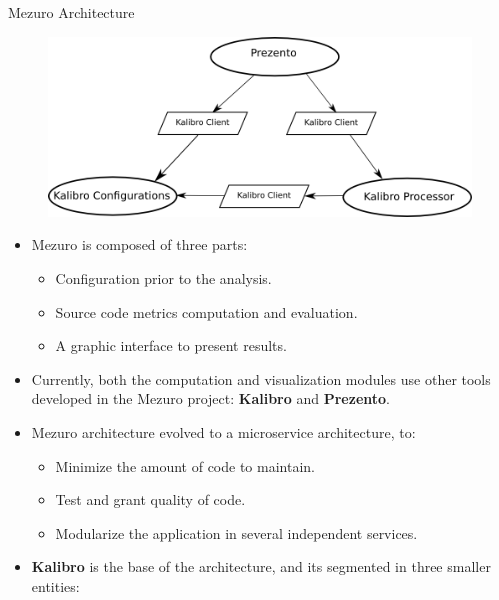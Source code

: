 \begin{block}{Mezuro Architecture}
        \begin{figure}
            \begin{center}
                \includegraphics[scale=1.5]{figures/MezuroArchitecture.png}
                \label{fig:architecture}
            \end{center}
        \end{figure}
    \begin{itemize}
        \item Mezuro is composed of three parts:
            \begin{itemize}
                \item Configuration prior to the analysis.
                \item Source code metrics computation and evaluation.
                \item A graphic interface to present results.
            \end{itemize}
        \item Currently, both the computation and visualization modules use
            other tools developed in the Mezuro project: \textbf{Kalibro} and
            \textbf{Prezento}.

        \item Mezuro architecture evolved to a microservice architecture, to:
            \begin{itemize}
                \item Minimize the amount of code to maintain.
                \item Test and grant quality of code.
                \item Modularize the application in several independent services.
            \end{itemize}
        \item \textbf{Kalibro} is the base of the architecture, and its
            segmented in three smaller entities:


\end{itemize}
\end{block}
